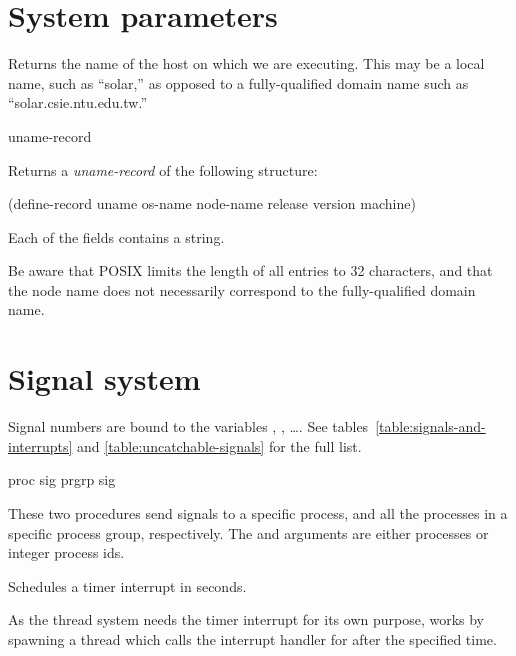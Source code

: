 \section{System parameters}

{} \str
\begin{desc}
Returns the name of the host on which we are executing.
This may be a local name, such as ``solar,'' as opposed to a
fully-qualified domain name such as ``solar.csie.ntu.edu.tw.''
\end{desc}

 {uname-record}
\begin{desc}
  Returns a \emph{uname-record} of the following structure:
\begin{code}
(define-record uname
   os-name
   node-name
   release
   version
   machine)\end{code}%

Each of the fields contains a string.

Be aware that POSIX limits the length of all entries to 32 characters,
and that the node name does not necessarily correspond to the
fully-qualified domain name.
\end{desc}

\section{Signal system}

Signal numbers are bound to the variables , ,
\ldots. See tables~\ref{table:signals-and-interrupts} and 
\ref{table:uncatchable-signals} for the full list.

   {proc sig}   \undefined
{} {prgrp sig} \undefined
\begin{desc}
These two procedures send signals to a specific process, and all the processes
in a specific process group, respectively.
The  and  arguments are either processes 
or integer process ids.
\end{desc}

 \undefined
\begin{desc}
  Schedules a timer interrupt in  seconds.
\end{desc}
\begin{note}
  As the thread system needs the timer interrupt for its own purpose,
   works by spawning a thread which calls the interrupt
  handler for  after the specified time.
\end{note}

